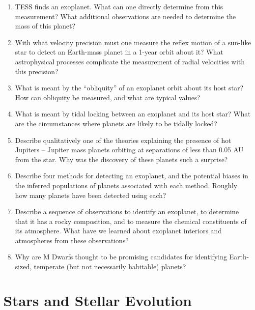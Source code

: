 \documentclass[10pt, oneside]{book}
\begin{document}
\begin{enumerate}[start=8]
    \item TESS finds an exoplanet. What can one directly determine from this measurement? What additional observations are needed to determine the mass of this planet?
    \item With what velocity precision must one measure the reflex motion of a sun-like star to detect an Earth-mass planet in a 1-year orbit about it? What astrophysical processes complicate the measurement of radial velocities with this precision?
    \item What is meant by the ``obliquity'' of an exoplanet orbit about its host star? How can obliquity be measured, and what are typical values?
    \item What is meant by tidal locking between an exoplanet and its host star? What are the circumstances where planets are likely to be tidally locked?
    \item Describe qualitatively one of the theories explaining the presence of hot Jupiters -- Jupiter mass planets orbiting at separations of less than 0.05 AU from the star. Why was the discovery of these planets such a surprise?
    \item Describe four methods for detecting an exoplanet, and the potential biases in the inferred populations of planets associated with each method. Roughly how many planets have been detected using each?
    \item Describe a sequence of observations to identify an exoplanet, to determine that it has a rocky composition, and to measure the chemical constituents of its atmosphere. What have we learned about exoplanet interiors and atmospheres from these observations?
    \item Why are M Dwarfs thought to be promising candidates for identifying Earth-sized, temperate (but not necessarily habitable) planets?
\end{enumerate}

\section{Stars and Stellar Evolution}
\end{document}
